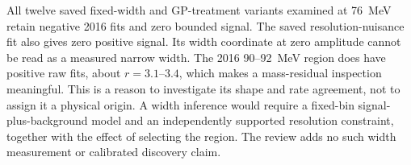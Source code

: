 All twelve saved fixed-width and GP-treatment variants examined at 76~MeV
retain negative 2016 fits and zero bounded signal. The saved resolution-nuisance
fit also gives zero positive signal. Its width coordinate at zero amplitude
cannot be read as a measured narrow width. The 2016 90--92~MeV region does
have positive raw fits, about $r=3.1$--$3.4$, which makes a mass-residual
inspection meaningful. This is a reason to investigate its shape and rate
agreement, not to assign it a physical origin. A width inference would require
a fixed-bin signal-plus-background model and an independently supported
resolution constraint, together with the effect of selecting the region.
The review adds no such width measurement or calibrated discovery claim.
